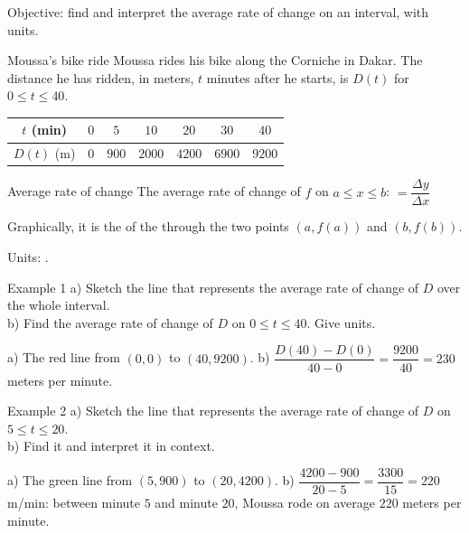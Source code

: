 \begin{center}\textsf{\small\color{apgrey}Objective: find and interpret the average rate of change on an interval, with units.}\end{center}
\begin{nrow}{Moussa's bike ride}
Moussa rides his bike along the Corniche in Dakar. The distance he has ridden, in meters, $t$ minutes after he starts, is $D(t)$ for $0\le t\le40$.
\begin{center}\begin{tabular}{|c|c|c|c|c|c|c|}\hline $t$ (min)&$0$&$5$&$10$&$20$&$30$&$40$\\\hline $D(t)$ (m)&$0$&$900$&$2000$&$4200$&$6900$&$9200$\\\hline\end{tabular}\end{center}
\end{nrow}
\begin{nrow}{Average rate of change}
The average rate of change of $f$ on $a\le x\le b$:\qquad {} $=\dfrac{\Delta y}{\Delta x}$\par\smallskip
Graphically, it is the  of the  through the two points $(a,f(a))$ and $(b,f(b))$.\par
Units: .
\end{nrow}
\begin{nrow}{Example 1}
a) Sketch the line that represents the average rate of change of $D$ over the whole interval.\\
b) Find the average rate of change of $D$ on $0\le t\le40$. Give units.
\begin{workspace}[2cm]
a) The red line from $(0,0)$ to $(40,9200)$. \;b) $\dfrac{D(40)-D(0)}{40-0}=\dfrac{9200}{40}=230$ meters per minute.
\end{workspace}
\end{nrow}
\begin{nrow}{Example 2}
a) Sketch the line that represents the average rate of change of $D$ on $5\le t\le20$.\\
b) Find it and interpret it in context.
\begin{workspace}[2.2cm]
a) The green line from $(5,900)$ to $(20,4200)$. \;b) $\dfrac{4200-900}{20-5}=\dfrac{3300}{15}=220$ m/min: between minute $5$ and minute $20$, Moussa rode on average $220$ meters per minute.
\end{workspace}
\end{nrow}
